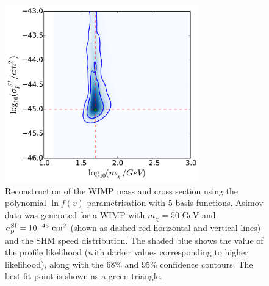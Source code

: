 \begin{figure}[t]
\centering
  \includegraphics[width=0.75\textwidth]{Poly/SHM_50_ASIMOV.pdf}
  \caption[Reconstruction of the WIMP mass and cross section using the polynomial $\ln f(v)$ parametrisation]{Reconstruction of the WIMP mass and cross section using the polynomial $\ln f(v)$ parametrisation with 5 basis functions. Asimov data was generated for a WIMP with $m_\chi = 50 \textrm{ GeV}$ and $\sigmapsi = 10^{-45} \cmsq$ (shown as dashed red horizontal and vertical lines) and the SHM speed distribution. The shaded blue shows the value of the profile likelihood (with darker values corresponding to higher likelihood), along with the 68\% and 95\% confidence contours. The best fit point is shown as a green triangle.}
  \label{fig:Poly:2D}
\end{figure}



